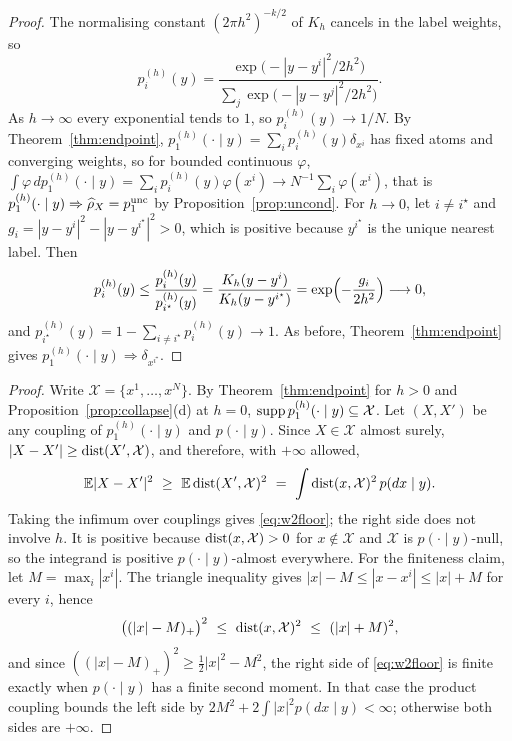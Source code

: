 \documentclass{article} %
\theoremstyle{plain}
\theoremstyle{definition}
\theoremstyle{remark}
\begin{document}
\label{apx:pf-zerobw}
\corzerobw*
\begin{proof}
The normalising constant $(2\pi h^2)^{-k/2}$ of $K_h$ cancels in the label weights, so
\[
p_i^{(h)}(y)=\frac{\exp\bigl(-|y-y^i|^2/2h^2\bigr)}{\sum_j\exp\bigl(-|y-y^j|^2/2h^2\bigr)} .
\]
As $h\to\infty$ every exponential tends to $1$, so $p_i^{(h)}(y)\to1/N$. By
Theorem~\ref{thm:endpoint}, $p_1^{(h)}(\cdot\mid y)=\sum_ip_i^{(h)}(y)\delta_{x^i}$ has fixed atoms
and converging weights, so for bounded continuous $\varphi$,
$\int\varphi\,dp_1^{(h)}(\cdot\mid y)=\sum_ip_i^{(h)}(y)\varphi(x^i)\to N^{-1}\sum_i\varphi(x^i)$,
that is $p_1^{(h)}(\cdot\mid y)\Rightarrow\widehat{\rho}_X=p_1^{\mathrm{unc}}$ by
Proposition~\ref{prop:uncond}. For $h\to0$, let $i\ne i^\star$ and
$g_i=|y-y^i|^2-|y-y^{i^\star}|^2>0$, which is positive because $y^{i^\star}$ is the unique nearest
label. Then
\[
p_i^{(h)}(y)\le\frac{p_i^{(h)}(y)}{p_{i^\star}^{(h)}(y)}
=\frac{K_h(y-y^i)}{K_h(y-y^{i^\star})}=\exp\Bigl(-\frac{g_i}{2h^2}\Bigr)\longrightarrow0,
\]
and $p_{i^\star}^{(h)}(y)=1-\sum_{i\ne i^\star}p_i^{(h)}(y)\to1$. As before,
Theorem~\ref{thm:endpoint} gives $p_1^{(h)}(\cdot\mid y)\Rightarrow\delta_{x^{i^\star}}$.
\end{proof}

\label{apx:pf-atomicity}
\propatomicity*
\begin{proof}
Write $\mathcal X=\{x^1,\dots,x^N\}$. By Theorem~\ref{thm:endpoint} for $h>0$ and
Proposition~\ref{prop:collapse}(d) at $h=0$, $\operatorname{supp} p_1^{(h)}(\cdot\mid y)\subseteq\mathcal X$. Let
$(X,X')$ be any coupling of $p_1^{(h)}(\cdot\mid y)$ and $p(\cdot\mid y)$. Since $X\in\mathcal X$
almost surely, $|X-X'|\ge\operatorname{dist}(X',\mathcal X)$, and therefore, with $+\infty$ allowed,
\[
\E|X-X'|^2\ \ge\ \E\dist(X',\mathcal X)^2\ =\ \int\dist(x,\mathcal X)^2\,p(dx\mid y).
\]
Taking the infimum over couplings gives \eqref{eq:w2floor}; the right side does not involve $h$.
It is positive because $\operatorname{dist}(x,\mathcal X)>0$ for $x\notin\mathcal X$ and $\mathcal X$ is
$p(\cdot\mid y)$-null, so the integrand is positive $p(\cdot\mid y)$-almost everywhere. For the
finiteness claim, let $M=\max_i|x^i|$. The triangle inequality gives
$|x|-M\le|x-x^i|\le|x|+M$ for every $i$, hence
\[
\bigl((|x|-M)_+\bigr)^2\ \le\ \dist(x,\mathcal X)^2\ \le\ (|x|+M)^2 ,
\]
and since $((|x|-M)_+)^2\ge\tfrac12|x|^2-M^2$, the right side of \eqref{eq:w2floor} is finite exactly
when $p(\cdot\mid y)$ has a finite second moment. In that case the product coupling bounds the left
side by $2M^2+2\int|x|^2p(dx\mid y)<\infty$; otherwise both sides are $+\infty$.
\end{proof}
\end{document}
